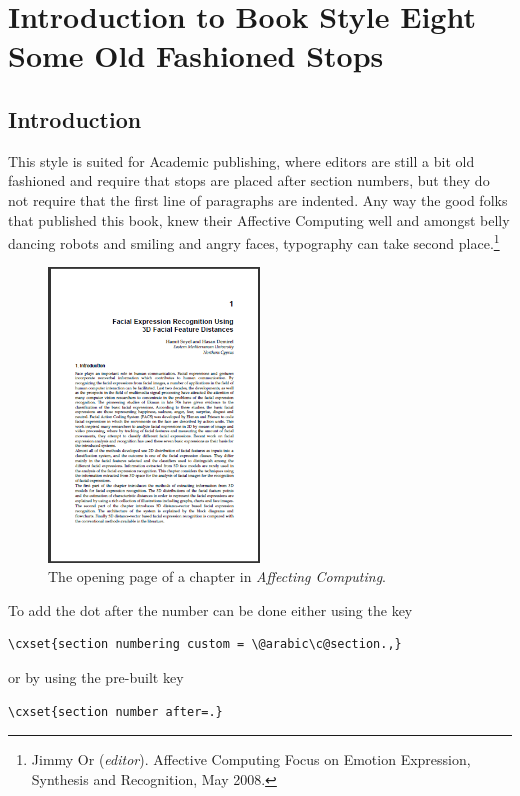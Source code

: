 \chapter[Style 08]{Introduction to Book Style Eight Some Old Fashioned Stops}
\label{st:eight}
\section{Introduction}

This style is suited for Academic publishing, where editors are still a bit old fashioned and require that stops are placed after section numbers, but they do not require that the first line of paragraphs are indented. Any way the good folks that published this book, knew their Affective Computing well and amongst belly dancing  robots and smiling and angry faces, typography can take second place.\footnote{Jimmy Or (\textit{editor}). Affective Computing
Focus on Emotion Expression,
Synthesis and Recognition, May 2008.
}

\example 
\medskip
\begin{figure}[ht]
\centering
\includegraphics[width=0.5\textwidth]{./chapters/chapter08.png}
\caption{The opening page of a chapter in \textit{Affecting Computing}.}
\end{figure}

\solution To add the dot after the number can be done either using the key
\begin{verbatim}
\cxset{section numbering custom = \@arabic\c@section.,}
\end{verbatim}
or by using the pre-built key
\begin{verbatim}
\cxset{section number after=.}
\end{verbatim}

